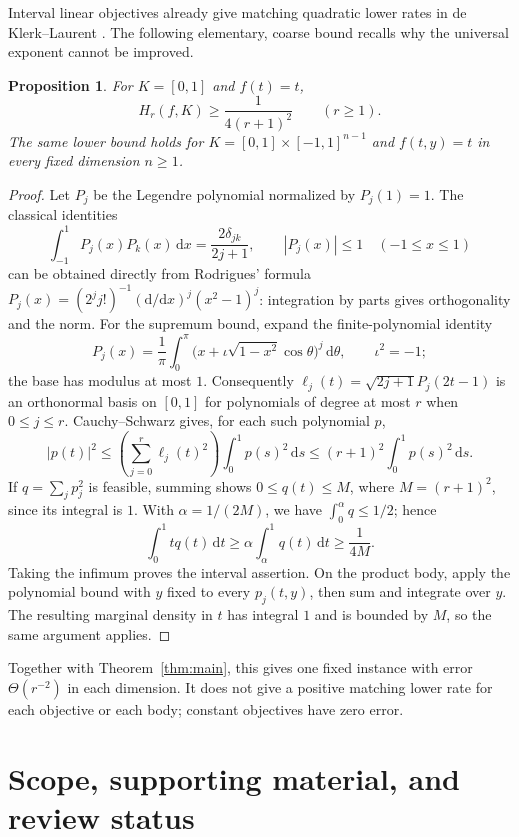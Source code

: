 \documentclass[11pt]{article}
\newtheorem{proposition}{Proposition}
\newcommand{\dd}{\,\mathrm{d}}
\begin{document}
Interval linear objectives already give matching quadratic lower
rates in de Klerk--Laurent
\cite[preprint Thm.~3.1 and Cors.~3.2--3.3]{deKlerkLaurent2020}.
The following elementary, coarse bound recalls why the universal
exponent cannot be improved.

\begin{proposition}\label{prop:lower}
For $K=[0,1]$ and $f(t)=t$,
\[
 H_r(f,K)\ge\frac1{4(r+1)^2}\qquad(r\ge1).
\]
The same lower bound holds for
$K=[0,1]\times[-1,1]^{n-1}$ and $f(t,y)=t$ in every fixed dimension
$n\ge1$.
\end{proposition}

\begin{proof}
Let $P_j$ be the Legendre polynomial normalized by $P_j(1)=1$.
The classical identities
\[
 \int_{-1}^1 P_j(x)P_k(x)\dd x=
       \frac{2\delta_{jk}}{2j+1},\qquad
 |P_j(x)|\le1\quad(-1\le x\le1)
\]
can be obtained directly from Rodrigues' formula
$P_j(x)=(2^jj!)^{-1}(\mathrm d/\mathrm dx)^j(x^2-1)^j$:
integration by parts gives orthogonality and the norm. For the
supremum bound, expand the finite-polynomial identity
\[
 P_j(x)=\frac1\pi\int_0^\pi
       \bigl(x+\iota\sqrt{1-x^2}\cos\theta\bigr)^j\dd\theta,
       \qquad \iota^2=-1;
\]
the base has modulus at most $1$.
Consequently $\ell_j(t)=\sqrt{2j+1}P_j(2t-1)$ is an orthonormal
basis on $[0,1]$ for polynomials of degree at most $r$ when
$0\le j\le r$. Cauchy--Schwarz gives, for each such polynomial $p$,
\[
 |p(t)|^2\le\left(\sum_{j=0}^r\ell_j(t)^2\right)
                 \int_0^1p(s)^2\dd s
             \le(r+1)^2\int_0^1p(s)^2\dd s.
\]
If $q=\sum_jp_j^2$ is feasible, summing shows $0\le q(t)\le M$,
where $M=(r+1)^2$, since its integral is $1$.
With $\alpha=1/(2M)$, we have $\int_0^\alpha q\le1/2$; hence
\[
 \int_0^1tq(t)\dd t\ge\alpha\int_\alpha^1q(t)\dd t
                \ge\frac1{4M}.
\]
Taking the infimum proves the interval assertion. On the product
body, apply the polynomial bound with $y$ fixed to every $p_j(t,y)$,
then sum and integrate over $y$. The resulting marginal density in
$t$ has integral $1$ and is bounded by $M$, so the same argument
applies.
\end{proof}

Together with Theorem~\ref{thm:main}, this gives one fixed instance
with error $\Theta(r^{-2})$ in each dimension. It does not give a
positive matching lower rate for each objective or each body; constant
objectives have zero error.

\section{Scope, supporting material, and review status}
\end{document}
